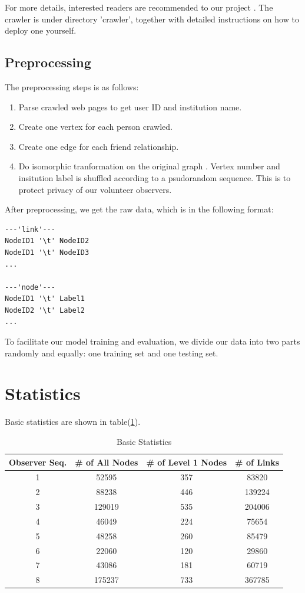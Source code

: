\documentclass[11pt,a4paper]{article}
\begin{document}
For more details, interested readers are recommended to 
our project \cite{hu2011-cd2hop}. The crawler is under 
directory 'crawler', together with detailed instructions 
on how to deploy one yourself. 

\subsection{Preprocessing}

The preprocessing steps is as follows:
\begin{enumerate}
	\item Parse crawled web pages to get user ID and institution name. 
	\item Create one vertex for each person crawled. 
	\item Create one edge for each friend relationship. 
	\item Do isomorphic tranformation on the original graph
	\cite{wiki_iso_graph}. Vertex number and insitution label 
	is shuffled according to a psudorandom sequence. 
	This is to protect privacy of our volunteer observers. 
\end{enumerate}

After preprocessing, we get the raw data, which is in the
following format:
\begin{Verbatim}
---'link'---
NodeID1 '\t' NodeID2
NodeID1 '\t' NodeID3
...

---'node'---
NodeID1 '\t' Label1
NodeID2 '\t' Label2
...
\end{Verbatim}

To facilitate our model training and evaluation, 
we divide our data into two parts randomly and equally: 
one training set and one testing set. 

\section{Statistics}

Basic statistics are shown in table(\ref{tbl:stat_basic}). 

\begin{table}[htb]
\caption{Basic Statistics}
\label{tbl:stat_basic}
\begin{tabular}{c|ccc}
\hline
Observer Seq. & \# of All Nodes & \# of Level 1 Nodes & \# of Links \\
\hline
1 & 52595 & 357 & 83820 \\
2 & 88238 & 446 & 139224 \\
3 & 129019 & 535 & 204006 \\
4 & 46049 & 224 & 75654 \\
5 & 48258 & 260 & 85479 \\
6 & 22060 & 120 & 29860 \\
7 & 43086 & 181 & 60719 \\
8 & 175237 & 733 & 367785 \\
\hline
\end{tabular}
\end{table}
\end{document}

